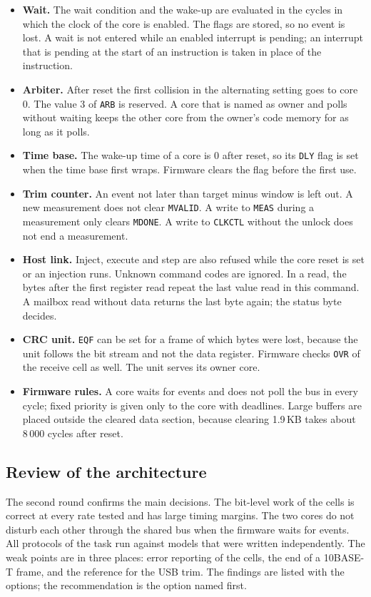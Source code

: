 \documentclass[10pt,a4paper]{article}
\newcommand{\reg}[1]{\texttt{#1}}
\begin{document}
\begin{itemize}
\item \textbf{Wait.} The wait condition and the wake-up are evaluated in the cycles in which the clock of the core
is enabled. The flags are stored, so no event is lost. A wait is not entered while an enabled interrupt is pending;
an interrupt that is pending at the start of an instruction is taken in place of the instruction.
\item \textbf{Arbiter.} After reset the first collision in the alternating setting goes to core 0. The value 3 of
\reg{ARB} is reserved. A core that is named as owner and polls without waiting keeps the other core from the
owner's code memory for as long as it polls.
\item \textbf{Time base.} The wake-up time of a core is 0 after reset, so its \reg{DLY} flag is set when the time base
first wraps. Firmware clears the flag before the first use.
\item \textbf{Trim counter.} An event not later than target minus window is left out. A new measurement does not clear
\reg{MVALID}. A write to \reg{MEAS} during a measurement only clears \reg{MDONE}. A write to \reg{CLKCTL} without the
unlock does not end a measurement.
\item \textbf{Host link.} Inject, execute and step are also refused while the core reset is set or an injection
runs. Unknown command codes are ignored. In a read, the bytes after the first register read repeat the last
value read in this command. A mailbox read without data returns the last byte again; the status byte decides.
\item \textbf{CRC unit.} \reg{EQF} can be set for a frame of which bytes were lost, because the unit follows the
bit stream and not the data register. Firmware checks \reg{OVR} of the receive cell as well. The unit serves its
owner core.
\item \textbf{Firmware rules.} A core waits for events and does not poll the bus in every cycle; fixed priority
is given only to the core with deadlines. Large buffers are placed outside the cleared data section, because
clearing 1.9\,KB takes about 8\,000 cycles after reset.
\end{itemize}

\subsection{Review of the architecture}

The second round confirms the main decisions. The bit-level work of the cells is correct at every rate tested
and has large timing margins. The two cores do not disturb each other through the shared bus when the firmware
waits for events. All protocols of the task run against models that were written independently. The weak
points are in three places: error reporting of the cells, the end of a 10BASE-T frame, and the reference for the
USB trim. The findings are listed with the options; the recommendation is the option named first.
\end{document}
